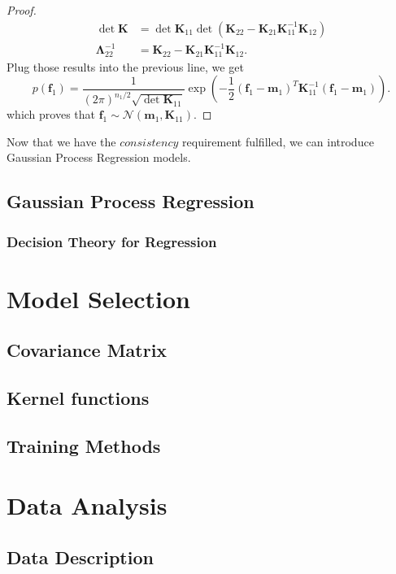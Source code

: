 \documentclass[12pt,a4paper]{article}
\theoremstyle{definition}
\numberwithin{equation}{section}
\let\vec\mathbf
\begin{document}
\begin{proof}
\begin{equation*}
\begin{split}
	\det\vec K&= \det\vec K_{11}\det(\vec K_{22}-\vec K_{21}\vec K_{11}^{-1}\vec K_{12})\\
	\vec \Lambda_{22}^{-1} &= \vec K_{22}-\vec K_{21}\vec K_{11}^{-1}\vec K_{12}.
	\end{split}
	\end{equation*}
	Plug those results into the previous line, we get
	\begin{equation*} \label{}
	p(\vec f_1) = \frac{1}{(2\pi)^{n_1/2}\sqrt{\det \vec K_{11}}} \exp{\left(-\frac{1}{2}\left(\vec f_1 - \vec m_1\right)^T\vec K_{11}^{-1}\left(\vec f_1 - \vec m _1 \right)\right)}.
	\end{equation*}
	which proves that $\vec f_1\sim\mathcal{N}(\vec m_1,\vec K_{11})$.
\end{proof}
Now that we have the $consistency$ requirement fulfilled, we can introduce Gaussian Process Regression models.
\subsection{Gaussian Process Regression}

\subsubsection{Decision Theory for Regression}

\newpage
\section{Model Selection}

\subsection{Covariance Matrix}

\subsection{Kernel functions}

\subsection{Training Methods}

\newpage
\section{Data Analysis}

\subsection{Data Description}
\end{document}
